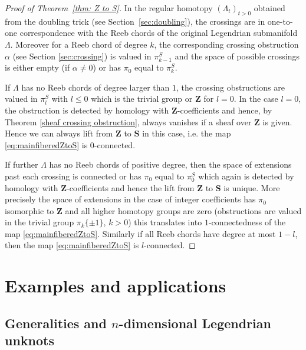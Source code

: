 \documentclass[12pt,a4paper]{article}
\numberwithin{equation}{section}
\theoremstyle{definition}
\theoremstyle{remark}
\newcommand{\Z}{\mathbf{Z}}
\renewcommand{\S}{\mathbf{S}}
\begin{document}
\begin{proof}[Proof of Theorem~\ref{thm: Z to S}]
In the regular homotopy $(\Lambda_t)_{t>0}$ obtained from the doubling trick (see Section~\ref{sec:doubling}),
the crossings are in one-to-one correspondence with the Reeb chords of the original Legendrian submanifold $\Lambda$.
Moreover for a Reeb chord of degree $k$, the corresponding crossing obstruction $\alpha$ (see Section \ref{sec:crossing})
is valued in $\pi_{k-1}^S$ and the space of possible crossings is either empty (if $\alpha\neq 0$) or has $\pi_0$ equal to $\pi_k^S$.

If $\Lambda$ has no Reeb chords of degree larger than $1$, the crossing obstructions are valued in $\pi_l^S$ with $l\leq 0$
which is the trivial group or $\Z$ for $l=0$. In the case $l=0$, the obstruction is detected by homology with $\Z$-coefficients
and hence, by Theorem \ref{sheaf crossing obstruction}, always vanishes if a sheaf over $\Z$ is given. Hence we can always lift from $\Z$ to $\S$ in this case, i.e.
the map \eqref{eq:mainfiberedZtoS} is $0$-connected.

If further $\Lambda$ has no Reeb chords of positive degree, then the space of extensions past each crossing is connected
or has $\pi_0$ equal to $\pi_0^S$ which again is detected by homology with $\Z$-coefficients and hence the lift from $\Z$ to $\S$ is unique.
More precisely the space of extensions in the case of integer coefficients has $\pi_0$ isomorphic to $\Z$
and all higher homotopy groups are zero (obstructions are valued in the trivial group $\pi_k \{\pm 1\}$, $k>0$)
this translates into $1$-connectedness of the map \eqref{eq:mainfiberedZtoS}.
Similarly if all Reeb chords have degree at most $1-l$, then the map \eqref{eq:mainfiberedZtoS} is $l$-connected.
\end{proof}

\section{Examples and applications}\label{sec: examples}
\subsection{Generalities and $n$-dimensional Legendrian unknots}
\end{document}

